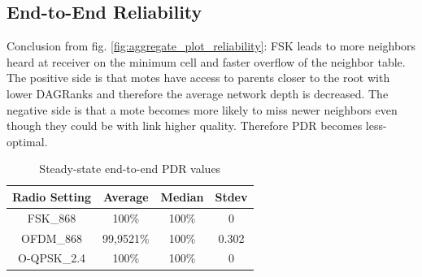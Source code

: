 \documentclass[journal]{IEEEtran}
\newcommand{\fsk}          {    FSK\_868}
\newcommand{\oqpsk}        {O-QPSK\_2.4}
\newcommand{\ofdm}         {OFDM\_868}
\begin{document}


\subsection{End-to-End Reliability}
\label{sec:reliability}

Conclusion from fig. \ref{fig:aggregate_plot_reliability}: FSK leads to more neighbors heard at receiver on the minimum cell and faster overflow of the neighbor table.
The positive side is that motes have access to parents closer to the root with lower DAGRanks and therefore the average network depth is decreased. 
The negative side is that a mote becomes more likely to miss newer neighbors even though they could be with link higher quality. Therefore PDR becomes less-optimal. 



\begin{table}
 \caption {Steady-state end-to-end PDR values} \label{tab:pdr_table} 
 \begin{center}
 \begin{tabular}{||c c c c||} 
 \hline
 Radio Setting & Average & Median & Stdev \\ [0.5ex] 
 \hline\hline
 \fsk & 100\% & 100\% & 0 \\ 
 \hline
 \ofdm & 99,9521\% & 100\% & 0.302 \\
 \hline
 \oqpsk & 100\% & 100\% & 0 \\
 \hline

\end{tabular}
\end{center}
\end{table}
\end{document}
